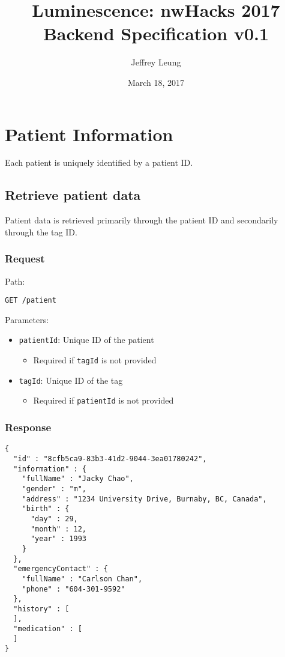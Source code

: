 \documentclass[10pt, oneside, letterpaper, titlepage]{article}
\title{Luminescence: nwHacks 2017 \\ \large Backend Specification v0.1}
\author{Jeffrey Leung}
\date{March 18, 2017}
\begin{document}
	\maketitle
	\clearpage

	\section{Patient Information}

	Each patient is uniquely identified by a patient ID.

	\subsection{Retrieve patient data}

		Patient data is retrieved primarily through the patient ID and secondarily through the tag ID.

		\subsubsection*{Request}

		Path:

		\begin{verbatim}
GET /patient
		\end{verbatim}

		\noindent
		Parameters:
		\begin{itemize}
			\item \verb|patientId|: Unique ID of the patient
			\begin{itemize}
				\item Required if \verb|tagId| is not provided
			\end{itemize}
			\item \verb|tagId|: Unique ID of the tag
			\begin{itemize}
				\item Required if \verb|patientId| is not provided
			\end{itemize}
		\end{itemize}

		\subsubsection*{Response}

		\begin{verbatim}
{
  "id" : "8cfb5ca9-83b3-41d2-9044-3ea01780242",
  "information" : {
    "fullName" : "Jacky Chao",
    "gender" : "m",
    "address" : "1234 University Drive, Burnaby, BC, Canada",
    "birth" : {
      "day" : 29,
      "month" : 12,
      "year" : 1993
    }
  },
  "emergencyContact" : {
    "fullName" : "Carlson Chan",
    "phone" : "604-301-9592"
  },
  "history" : [
  ],
  "medication" : [
  ]
}
		\end{verbatim}
\end{document}
